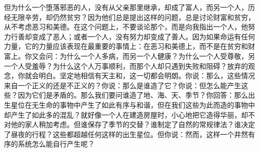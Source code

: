 但为什么一个堕落邪恶的人，没有从父亲那里继承，却成了富人，而另一个人，历经无限辛劳，却仍然贫穷？因为他们总是提出这样的问题，总是讨论财富和贫穷，从不考虑恶习和美德。在这个问题上，不要谈论那个，而是向我指出一个人，他努力行善却变成了恶人；或者一个人，没有努力却变成了善人。因为如果命运有任何力量，它的力量应该表现在最重要的事情上：在恶习和美德上，而不是在贫穷和财富上。你又会问：为什么一个人多病，而另一个人健康？为什么一个人受尊敬，另一个人受羞辱？为什么这个人万事顺利，而那个人却只遇到失败和阻碍？放弃的观念，你就会明白。坚定地相信有天主和，这一切都会明朗。你说：那么，这些情况来自一个正义的还是不正义的？你说：那么是谁造了它？你说：但怎么能产生这些？因为它们是矛盾的。那么我们要问谁造了地、海、天、季节？你回答：那么出生星位在无生命的事物中产生了如此有序与和谐，但在我们这些为此而造的事物中却产生了如此多的混乱？就好像一个人在建造房屋时，小心地把它造得华丽，却不对他的家人稍加考虑。但谁保存了季节的交替？谁制定了自然的常规律法？谁决定了昼夜的行程？这些都超越任何这样的出生星位。但你说：然而，这样一个井然有序的系统怎么能自行产生呢？\par

